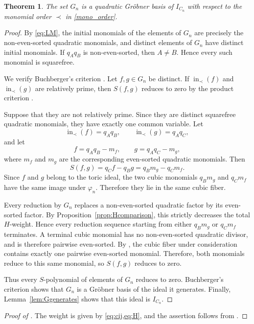 \documentclass[11pt]{amsart}
\newtheorem{theorem}{Theorem}[section]
\theoremstyle{definition}
\newcommand{\inop}{\operatorname{in}}
\numberwithin{equation}{section}
\begin{document}
\begin{theorem}\label{thm:GB}
The set $G_n$ is a quadratic Gr\"obner basis of $I_{C_n}$ with respect to the monomial order $\prec$ in \eqref{mono_order}.
\end{theorem}

\begin{proof}
By \eqref{eq:LM}, the initial monomials of the elements of $G_n$ are
precisely the non-even-sorted quadratic monomials, and
distinct elements of $G_n$ have distinct initial monomials.
If $q_Aq_B$ is non-even-sorted, then $A\ne B$.
Hence every such monomial is squarefree.

We verify Buchberger's criterion \cite[Theorem~1.29]{HerzogHibiOhsugi2018}.  Let $f,g\in G_n$ be distinct.  If
$\inop_\prec(f)$ and $\inop_\prec(g)$ are relatively prime, then
$S(f,g)$ reduces to zero by the product criterion \cite[Lemma~1.27]{HerzogHibiOhsugi2018}.

Suppose that they are not relatively prime.  Since they are distinct
squarefree quadratic monomials, they have exactly one common variable.
Let
\[
 \inop_\prec(f)=q_Aq_B,\qquad
 \inop_\prec(g)=q_Aq_C,
\]
and let
\[
 f=q_Aq_B-m_f,\qquad
 g=q_Aq_C-m_g,
\]
where $m_f$ and $m_g$ are the corresponding even-sorted quadratic
monomials.  Then
\[
 S(f,g)=q_Cf-q_Bg
       =q_Bm_g-q_Cm_f.
\]
Since $f$ and $g$ belong to the toric ideal, the two cubic monomials
$q_Bm_g$ and $q_Cm_f$ have the same image under $\varphi_n$.
Therefore they lie in the same cubic fiber.

Every reduction by $G_n$ replaces a non-even-sorted quadratic factor
by its even-sorted factor.  By Proposition~\ref{prop:Hcomparison}, this strictly
decreases the total $H$-weight.  Hence every reduction sequence
starting from either $q_Bm_g$ or $q_Cm_f$ terminates.  A terminal
cubic monomial has no non-even-sorted quadratic divisor, and is
therefore pairwise even-sorted.
By , the cubic fiber under consideration
contains exactly one pairwise even-sorted monomial. 
Therefore, both monomials reduce to this same monomial, so $S(f,g)$ reduces to zero.

Thus every $S$-polynomial of elements of $G_n$ reduces to zero.  
Buchberger's
criterion shows that $G_n$ is a Gr\"obner basis of the ideal it generates.
Finally, Lemma~\ref{lem:Ggenerates} shows that this ideal is
$I_{C_n}$.
\end{proof}

\begin{proof}[Proof of ]
The weight is given by \cref{eq:cij,eq:H}, and the assertion follows from .
\end{proof}
\end{document}
